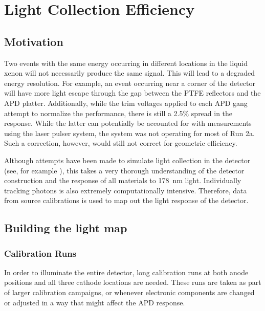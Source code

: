 \documentclass[herrin-thesis.tex]{subfiles}
\begin{document}
\chapter{Light Collection Efficiency}
\label{app:lightmap}

\section{Motivation}
Two events with the same energy occurring in different locations in the liquid xenon will not necessarily produce the same signal. This will lead to a degraded energy resolution. For example, an event occurring near a corner of the detector will have more light escape through the gap between the PTFE reflectors and the APD platter. Additionally, while the trim voltages applied to each APD gang attempt to normalize the performance, there is still a 2.5\% spread in the response. While the latter can potentially be accounted for with measurements using the laser pulser system, the system was not operating for most of Run 2a. Such a correction, however, would still not correct for geometric efficiency.

Although attempts have been made to simulate light collection in the detector (see, for example \cite{Mackay:2011fk}), this takes a very thorough understanding of the detector construction and the response of all materials to \SI{178}{\nm} light. Individually tracking photons is also extremely computationally intensive. Therefore, data from source calibrations is used to map out the light response of the detector.

\section{Building the light map}
\subsection{Calibration Runs}
In order to illuminate the entire detector, long calibration runs at both anode positions and all three cathode locations are needed. These runs are taken as part of larger calibration campaigns, or whenever electronic components are changed or adjusted in a way that might affect the APD response.
\end{document}
